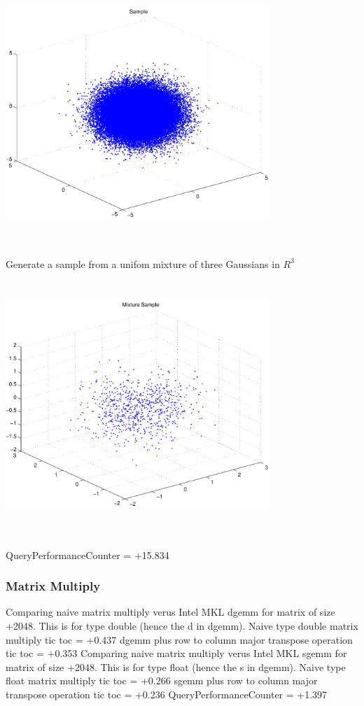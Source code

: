 \documentclass[9pt]{article}
\theoremstyle{plain}
\theoremstyle{definition}
\theoremstyle{remark}
\numberwithin{equation}{section}
\begin{document}
\includegraphics[width=10.0cm,height=10.0cm]{R_3_Normal.pdf}

Generate a sample from a unifom mixture of three Gaussians in $R^3$
\includegraphics[width=10.0cm,height=10.0cm]{R_3_Normal_Mixture.pdf}

QueryPerformanceCounter  =  +15.834
\subsubsection{Matrix Multiply}
Comparing naive matrix multiply verus Intel MKL dgemm for matrix of size +2048.
This is for type double (hence the d in dgemm).
Naive type double matrix multiply tic toc  =  +0.437
dgemm plus row to column major transpose operation tic toc  =  +0.353
Comparing naive matrix multiply verus Intel MKL sgemm for matrix of size +2048.
This is for type float (hence the s in dgemm).
Naive type float matrix multiply tic toc  =  +0.266
sgemm plus row to column major transpose operation tic toc  =  +0.236
QueryPerformanceCounter  =  +1.397
\end{document}
